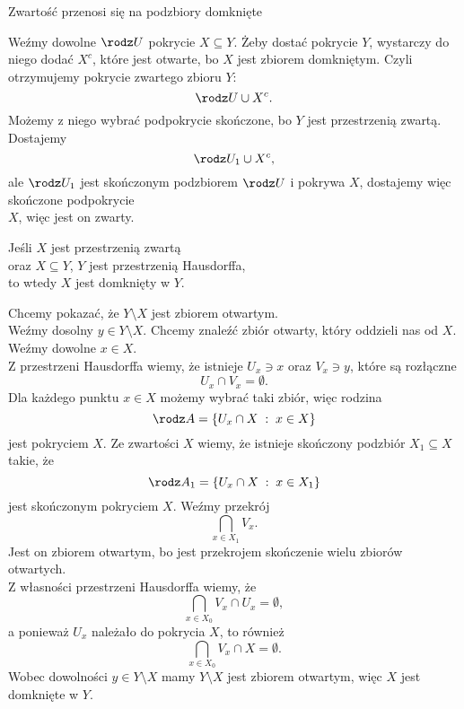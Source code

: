 \begin{center}\large
    Zwartość przenosi się na podzbiory domknięte
\end{center}\bigskip
\dowod
Weźmy dowolne $\rodz U$ pokrycie $X\subseteq Y$. Żeby dostać pokrycie $Y$, wystarczy do niego dodać $X^c$, które jest otwarte, bo $X$ jest zbiorem domkniętym. Czyli otrzymujemy pokrycie zwartego zbioru $Y$:
$$\rodz U\cup X^c.$$
Możemy z niego wybrać podpokrycie skończone, bo $Y$ jest przestrzenią zwartą. Dostajemy
$$\rodz U_1\cup X^c,$$
ale $\rodz U_1$ jest skończonym podzbiorem $\rodz U$ i pokrywa $X$, dostajemy więc skończone podpokrycie \\$X$, więc jest on zwarty.
\kondow
{}\bigskip
\begin{center}\large
    Jeśli $X$ jest przestrzenią zwartą \\oraz $X\subseteq Y$, $Y$ jest przestrzenią Hausdorffa, \\to wtedy $X$ jest domknięty w $Y$.
\end{center}\bigskip
\dowod
Chcemy pokazać, że $Y\setminus X$ jest zbiorem otwartym.\medskip\\
Weźmy dosolny $y\in Y\setminus X$. Chcemy znaleźć zbiór otwarty, który oddzieli nas od $X$. Weźmy dowolne $x\in X$.\medskip\\
Z przestrzeni Hausdorffa wiemy, że istnieje $U_x\ni x$ oraz $V_x\ni y$, które są rozłączne
$$U_x\cap V_x=\emptyset.$$
Dla każdego punktu $x\in X$ możemy wybrać taki zbiór, więc rodzina
$$\rodz A=\{U_x\cap X\;:\;x\in X\}$$
jest pokryciem $X$. Ze zwartości $X$ wiemy, że istnieje skończony podzbiór $X_1\subseteq X$ takie, że
$$\rodz A_1=\{U_x\cap X\;:\;x\in X_1\}$$
jest skończonym pokryciem $X$. Weźmy przekrój
$$\bigcap\limits_{x\in X_1}V_x.$$
Jest on zbiorem otwartym, bo jest przekrojem skończenie wielu zbiorów otwartych. \\Z własności przestrzeni Hausdorffa wiemy, że
$$\bigcap\limits_{x\in X_0}V_x\cap U_x=\emptyset,$$
a ponieważ $U_x$ należało do pokrycia $X$, to również
$$\bigcap\limits_{x\in X_0}V_x\cap X=\emptyset.$$
Wobec dowolności $y\in Y\setminus X$ mamy $Y\setminus X$ jest zbiorem otwartym, więc $X$ jest domknięte w $Y$.
\kondow
{}\bigskip

